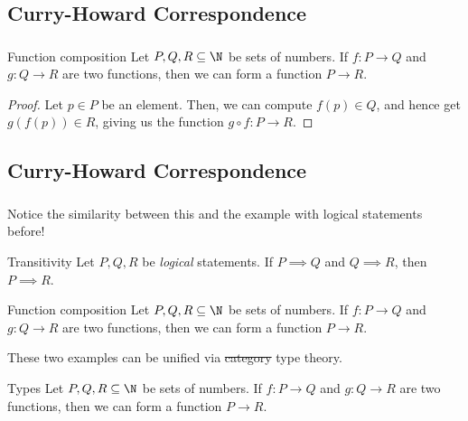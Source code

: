 \subsection{Curry-Howard Correspondence}
\begin{frame}\frametitle{\insertsubsection}

\begin{block}{Function composition}
  Let \(P, Q, R \subseteq \N\) be sets of numbers. If \(f : P \to Q\) and \(g : Q \to R\) are two functions, then we can form a function \(P \to R\).
\end{block}

\begin{proof}
  Let \(p \in P\) be an element. Then, we can compute \(f(p) \in Q\), and hence get \(g(f(p)) \in R\), giving us the function \(g \circ f : P \to R\).
\end{proof}

\end{frame}




\subsection{Curry-Howard Correspondence}
\begin{frame}\frametitle{\insertsubsection}

Notice the similarity between this and the example with logical statements before!

\begin{block}{Transitivity}
  Let \(P, Q, R\) be \textit{logical} statements. If \(P \implies Q\) and \(Q \implies R\), then \(P \implies R\).
\end{block}

\begin{block}{Function composition}
  Let \(P, Q, R \subseteq \N\) be sets of numbers. If \(f : P \to Q\) and \(g : Q \to R\) are two functions, then we can form a function \(P \to R\).
\end{block} \pause

These two examples can be unified via \sout{category} type theory. \pause

\begin{block}{Types}
  Let \(P, Q, R \subseteq \N\) be sets of numbers. If \(f : P \to Q\) and \(g : Q \to R\) are two functions, then we can form a function \(P \to R\).
\end{block} \pause

\end{frame}
